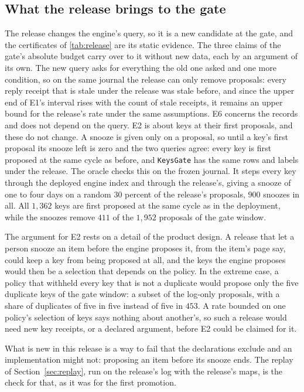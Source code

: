 \documentclass[11pt]{article}
\newcommand{\code}[1]{\texttt{#1}}
\theoremstyle{definition}
\theoremstyle{plain}
\begin{document}
\subsection{What the release brings to the gate}\label{sec:releasegate}

The release changes the engine's query, so it is a new candidate at the gate, and the certificates
of \cref{tab:release} are its static evidence. The three claims of the gate's absolute budget carry
over to it without new data, each by an argument of its own. The new query asks for everything the
old one asked and one more condition, so on the same journal the release can only remove proposals:
every reply receipt that is stale under the release was stale before, and since the upper end of
E1's interval rises with the count of stale receipts, it remains an upper bound for the release's
rate under the same assumptions. E6 concerns the records and does not depend on the query. E2 is
about keys at their first proposals, and these do not change. A snooze is given only on a proposal,
so until a key's first proposal its snooze left is zero and the two queries agree: every key is
first proposed at the same cycle as before, and \code{KeysGate} has the same rows and labels under
the release. The oracle checks this on the frozen journal. It steps every key through the deployed
engine index and through the release's, giving a snooze of one to four days on a random 30 percent
of the release's proposals, $900$ snoozes in all. All $1{,}362$ keys are first proposed at the same
cycle as in the deployment, while the snoozes remove $411$ of the $1{,}952$ proposals of the gate
window.

The argument for E2 rests on a detail of the product design. A release that let a person snooze an
item before the engine proposes it, from the item's page say, could keep a key from being proposed
at all, and the keys the engine proposes would then be a selection that depends on the policy. In
the extreme case, a policy that withheld every key that is not a duplicate would propose only the
five duplicate keys of the gate window: a subset of the log-only proposals, with a share of
duplicates of five in five instead of five in $453$. A rate bounded on one policy's selection of
keys says nothing about another's, so such a release would need new key receipts, or a declared
argument, before E2 could be claimed for it.

What is new in this release is a way to fail that the declarations exclude and an implementation
might not: proposing an item before its snooze ends. The replay of Section~\ref{sec:replay}, run
on the release's log with the release's maps, is the check for that, as it was for the first
promotion.
\end{document}
